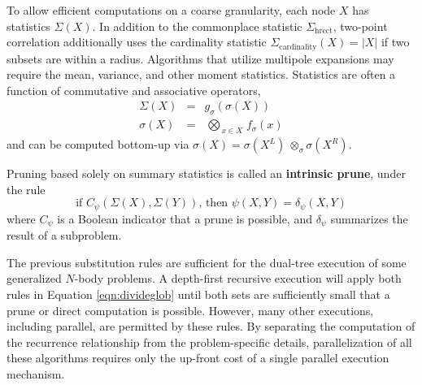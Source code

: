 \documentclass[times, leqno,twocolumn]{article}
\newcommand{\defterm}[1]{{\bf #1}}
\newcommand{\kdleft}[1]{#1^{\!L}}
\newcommand{\kdright}[1]{#1^{\!R}}
\newcommand{\myOp}[1]{\mathop{\bigotimes\nolimits\!\!_{#1}}}
\newcommand{\myop}[1]{{\scriptstyle\:}\otimes_{\!#1}}
\newcommand{\letterglob}{\psi}
\newcommand{\inglob}{\psi}
\newcommand{\canpruneglob}{C_{\letterglob}}
\newcommand{\deltaglob}{\delta_{\letterglob}}
\newcommand{\namestat}[1]{\Sigma_{\text{#1}}}
\newcommand{\outstat}{\Sigma}
\newcommand{\instat}{\sigma}
\newcommand{\Opstat}{\myOp{\instat}}
\newcommand{\opstat}{\myop{\instat}}
\newcommand{\fstat}{f_{\instat}}
\newcommand{\gstat}{g_{\instat}}
\begin{document}
To allow efficient computations on a coarse granularity, each node $X$ has statistics $\outstat(X)$.
In addition to the commonplace statistic $\namestat{hrect}$, two-point correlation additionally uses the cardinality statistic $\namestat{cardinality}(X) = |X|$ if two subsets are within a radius.
Algorithms that utilize multipole expansions may require the mean, variance, and other moment statistics.
Statistics are often a function of commutative and associative operators,
\begin{eqnarray}
\outstat(X) &=& \gstat(\instat(X))
\\
\instat(X) &=& \Opstat_{x \in X} \fstat(x)
\label{eqn:defstat}
\end{eqnarray}
\noindent and can be computed bottom-up via $\instat(X) = \instat(\kdleft{X}) \opstat \instat(\kdright{X})$.

Pruning based solely on summary statistics is called an \defterm{intrinsic prune}, under the rule
\begin{equation}
\text{if } \canpruneglob(\outstat(X), \outstat(Y)) \text{, then } \inglob(X, Y) = \deltaglob(X, Y)
\label{eqn:intrinsic}
\end{equation}
\noindent where $\canpruneglob$ is a Boolean indicator that a prune is possible, and $\deltaglob$ summarizes the result of a subproblem.

\noindent The previous substitution rules are sufficient for the dual-tree execution of some generalized $N$-body problems.
A depth-first recursive execution will apply both rules in Equation \ref{eqn:divideglob} until both sets are sufficiently small that a prune or direct computation is possible.
However, many other executions, including parallel, are permitted by these rules.
By separating the computation of the recurrence relationship from the problem-specific details, parallelization of all these algorithms requires only the up-front cost of a single parallel execution mechanism.

\end{document}
